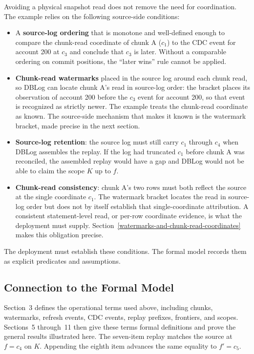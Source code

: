 \documentclass[letterpaper,10pt,twocolumn]{article}
\providecommand{\tightlist}{\setlength{\itemsep}{0pt}\setlength{\parskip}{0pt}}
\begin{document}
Avoiding a physical snapshot read does not remove the need for
coordination. The example relies on the following source-side
conditions:

\begin{itemize}
\tightlist
\item
  A \textbf{source-log ordering} that is monotone and well-defined
  enough to compare the chunk-read coordinate of chunk A
  ($c_1$) to the CDC event for account 200 at
  $c_3$ and conclude that $c_3$ is later.
  Without a comparable ordering on commit positions, the ``later wins''
  rule cannot be applied.
\item
  \textbf{Chunk-read watermarks} placed in the source log around each
  chunk read, so DBLog can locate chunk A's read in source-log order:
  the bracket places its observation of account 200 before the $c_3$
  event for account 200, so that event is recognized as strictly newer.
  The example treats the chunk-read coordinate as known. The
  source-side mechanism that makes it known is the watermark bracket,
  made precise in the next section.
\item
  \textbf{Source-log retention}: the source log must still carry
  $c_1$ through $c_4$ when DBLog assembles the
  replay. If the log had truncated $c_1$ before chunk A was
  reconciled, the assembled replay would have a gap and DBLog would not
  be able to claim the scope $K$ up to $f$.
\item
  \textbf{Chunk-read consistency}: chunk A's two rows must both reflect
  the source at the single coordinate $c_1$. The watermark bracket
  locates the read in source-log order but does not by itself
  establish that single-coordinate attribution. A consistent
  statement-level read, or per-row coordinate evidence, is what the
  deployment must supply.
  Section~\ref{watermarks-and-chunk-read-coordinates} makes this
  obligation precise.
\end{itemize}

The deployment must establish these conditions. The formal model
records them as explicit predicates and assumptions.

\subsection{Connection to the Formal Model}\label{what-comes-next}

Section~3 defines the operational terms used above, including chunks,
watermarks, refresh events, CDC events, replay prefixes, frontiers, and
scopes. Sections~5 through~11 then give these terms formal definitions
and prove the general results illustrated here. The seven-item replay
matches the source at $f=c_4$ on $K$. Appending the eighth item advances
the same equality to $f'=c_5$.
\end{document}
